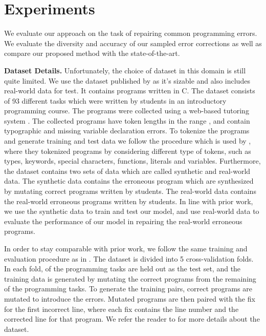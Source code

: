 \documentclass[letterpaper]{article} \usepackage{aaai20}  \usepackage{times}  \usepackage{helvet} \usepackage{courier}  \usepackage[hyphens]{url}  \usepackage{graphicx}
\newcommand{\myparagraph}[1]{\vspace{0.0em}\noindent\textbf{#1.}}
\begin{document}
\section{Experiments}
\label{experiments}

We evaluate our approach on the task of repairing common programming errors. We evaluate the diversity and accuracy of our sampled error corrections as well as 
     compare our proposed method with the state-of-the-art.

\myparagraph{Dataset Details} 
Unfortunately, the choice of dataset in this domain is still quite limited. We use the dataset published by \citeauthor{Gupta2017DeepFixFC} as it's sizable and also includes real-world data for test. It contains programs written in C. The dataset consists of 93 different tasks which were written by students in an introductory programming course. The programs were collected using a web-based tutoring system \cite{das16tutorin}. The collected programs have token lengths in the range , and contain typographic and missing variable declaration errors. To tokenize the programs and generate training and test data we follow the procedure which is used by \citeauthor{Gupta2017DeepFixFC}, where they tokenized programs by considering different type of tokens, such as types, keywords, special characters, functions, literals and variables. Furthermore, the dataset contains two sets of data which are called synthetic and real-world data. The synthetic data contains the erroneous program which are synthesized by mutating correct programs written by students. The real-world data contains the real-world erroneous programs written by students. In line with prior work, we use the synthetic data to train and test our model, and use real-world data to evaluate the performance of our model in repairing the real-world erroneous programs.

In order to stay comparable with prior work, we follow the same training and evaluation procedure as in \citeauthor{Gupta2017DeepFixFC}. The dataset is divided into 5 cross-validation folds. In each fold,  of the programming tasks are held out as the test set, and the training data is generated by mutating the correct programs from the remaining  of the programming tasks. To generate the training pairs, correct programs are mutated to introduce the errors. Mutated programs are then paired with the fix for the first incorrect line, where each fix contains the line number and the corrected line for that program. We refer the reader to \citeauthor{Gupta2017DeepFixFC} for more details about the dataset.
\end{document}
